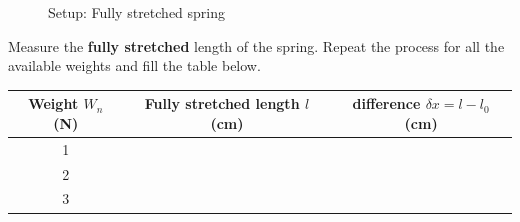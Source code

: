 \documentclass[10pt]{article}
\begin{document}
\begin{enumerate}
\begin{figure}[h]
\centering
\caption{Setup: Fully stretched spring}
\label{springsthand}
\end{figure}
Measure the \textbf{fully stretched} length of the spring.  Repeat the process for all the available weights and fill the table below.   
\end{enumerate}
\begin{center}
 \begin{tabular}{||c c c||} 
 \hline
 Weight $W_n$ (N) & Fully stretched length $l$ (cm) & difference $\delta x = l-l_0$ (cm)\\ [0.5ex] 
 \hline\hline
 1 &  & \\ 
 \hline
 2 &  &\\
\hline
 3 & &\\
\hline
\end{tabular}
\end{center}
\end{document}

